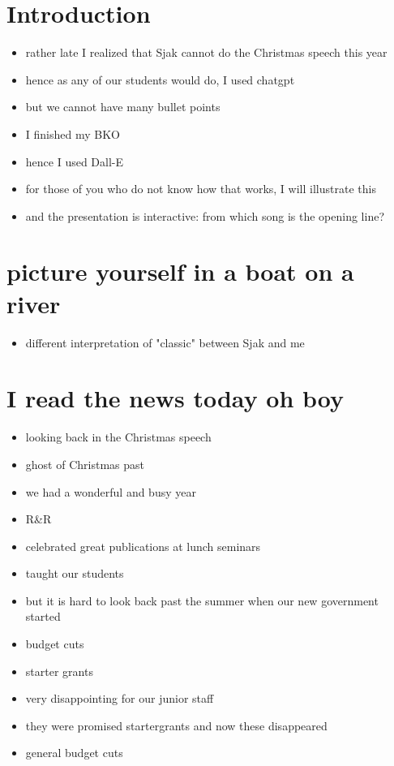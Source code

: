 \documentclass[a4paper,12pt]{article}
\author{Jan Boone}
\date{\today}
\title{}
\begin{document}
\section*{Introduction}
\label{sec:org7fa408f}
\begin{itemize}
\item rather late I realized that Sjak cannot do the Christmas speech this year
\item hence as any of our students would do, I used chatgpt
\item but we cannot have many bullet points
\item I finished my BKO
\item hence I used Dall-E
\item for those of you who do not know how that works, I will illustrate this
\item and the presentation is interactive: from which song is the opening line?
\end{itemize}
\section*{picture yourself in a boat on a river}
\label{sec:org96e6d40}
\begin{itemize}
\item different interpretation of "classic" between Sjak and me
\end{itemize}
\section*{I read the news today oh boy}
\label{sec:org0d6d85f}
\begin{itemize}
\item looking back in the Christmas speech
\item ghost of Christmas past
\item we had a wonderful and busy year
\item R\&R
\item celebrated great publications at lunch seminars
\item taught our students
\item but it is hard to look back past the summer when our new government started
\item budget cuts
\item starter grants
\item very disappointing for our junior staff
\item they were promised startergrants and now these disappeared
\item general budget cuts
\end{itemize}
\end{document}
